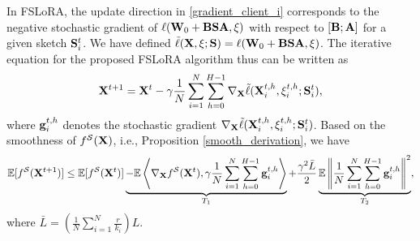 \documentclass{article} %
\theoremstyle{plain}
\theoremstyle{definition}
\begin{document}
In FSLoRA, the update direction in \eqref{gradient_client_i} corresponds to the negative stochastic gradient of \(\ell({\bf W}_0 + {\bf B} {\bf S} {\bf A}, \xi)\) with respect to \([{\bf B}; {\bf A}]\) for a given sketch \( {\bf S}_i^t\).
We have defined \(\tilde{\ell} ({\bf X}, \xi; {\bf S}) = \ell({\bf W}_0 + {\bf B}{\bf S}{\bf A}, \xi)\). The iterative equation for the proposed FSLoRA algorithm thus can be written as
\begin{equation}
   {\bf X}^{t+1} ={\bf X}^{t} - \gamma \frac{1}{N} \sum_{i=1}^{N} \sum_{h=0}^{H-1} \nabla_{\bf X} \tilde{\ell} ({\bf X}^{t,h}_i, \xi_i^{t,h}; {\bf S}_i^t),
\end{equation}
where \({\bf g}^{t,h}_i\) denotes the stochastic gradient \(\nabla_{\bf X} \tilde{\ell} ({\bf X}^{t,h}_i, \xi_i^{t,h}; {\bf S}_i^t)\).
Based on the smoothness of $f^{\mathcal{S}}(\bf X)$, i.e., Proposition \ref{smooth_derivation}, we have
\begin{align}\label{expansion_smooth}
   \mathbb{E} [f^{\mathcal{S}}({\bf X}^{t+1})] \leq \mathbb{E}[f^{\mathcal{S}}({\bf X}^t)] \underbrace{-\mathbb{E}\left \langle
    \nabla_{\bf X} f^{\mathcal{S}} ({\bf X}^t) , \gamma \frac{1}{N} \sum_{i=1}^{N} \sum_{h=0}^{H-1} {\bf g}^{t,h}_i
    \right \rangle}_{T_1} +
    \frac{\gamma^2 \bar{L}}{2} \underbrace{ \mathbb{E}\left \| \frac{1}{N} \sum_{i=1}^{N} \sum_{h=0}^{H-1}{\bf g}^{t,h}_i \right \|^2}_{T_2},
\end{align}
where \(\bar{L} = \left( \frac{1}{N} \sum_{i=1}^N \frac{r}{k_i} \right) L \).
\end{document}
